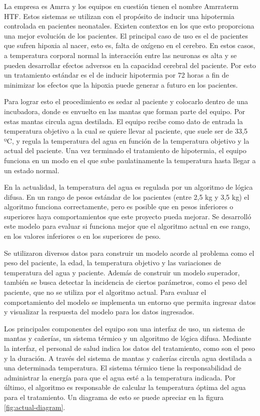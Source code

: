 La empresa es Amrra \citep{amrra_company} y los equipos en cuestión tienen el nombre Amrraterm HTF. Estos sistemas se utilizan con el propósito de inducir una hipotermia controlada en pacientes neonatales. Existen contextos en los que esto proporciona una mejor evolución de los pacientes. El principal caso de uso es el de pacientes que sufren hipoxia al nacer, esto es, falta de oxígeno en el cerebro. En estos casos, a temperatura corporal normal la interacción entre las neuronas es alta y se pueden desarrollar efectos adversos en la capacidad cerebral del paciente. Por esto un tratamiento estándar es el de inducir hipotermia por 72 horas a fin de minimizar los efectos que la hipoxia puede generar a futuro en los pacientes. 

Para lograr esto el procedimiento es sedar al paciente y colocarlo dentro de una incubadora, donde es envuelto en las mantas que forman parte del equipo. Por estas mantas circula agua destilada. El equipo recibe como dato de entrada la temperatura objetivo a la cual se quiere llevar al paciente, que suele ser de 33,5 ºC, y regula la temperatura del agua en función de la temperatura objetivo y la actual del paciente. Una vez terminado el tratamiento de hipotermia, el equipo funciona en un modo en el que sube paulatinamente la temperatura hasta llegar a un estado normal.

En la actualidad, la temperatura del agua es regulada por un algoritmo de lógica difusa. En un rango de pesos estándar de los pacientes (entre 2,5 kg y 3,5 kg) el algoritmo funciona correctamente, pero es posible que en pesos inferiores o superiores haya comportamientos que este proyecto pueda mejorar. Se desarrolló este modelo para evaluar si funciona mejor que el algoritmo actual en ese rango, en los valores inferiores o en los superiores de peso. 

Se utilizaron diversos datos para construir un modelo acorde al problema como el peso del paciente, la edad, la temperatura objetivo y las variaciones de temperatura del agua y paciente. Además de construir un modelo superador, también se busca detectar la incidencia de ciertos parámetros, como el peso del paciente, que no se utiliza por el algoritmo actual. Para evaluar el comportamiento del modelo se implementa un entorno que permita ingresar datos y visualizar la respuesta del modelo para los datos ingresados. 

Los principales componentes del equipo son una interfaz de uso, un sistema de mantas y cañerías, un sistema térmico y un algoritmo de lógica difusa. Mediante la interfaz, el personal de salud indica los datos del tratamiento, como son el peso y la duración. A través del sistema de mantas y cañerías circula agua destilada a una determinada temperatura. El sistema térmico tiene la responsabilidad de administrar la energía para que el agua esté a la temperatura indicada. Por último, el algoritmo es responsable de calcular la temperatura óptima del agua para el tratamiento. Un diagrama de esto se puede apreciar en la figura \ref{fig:actual-diagram}. 

